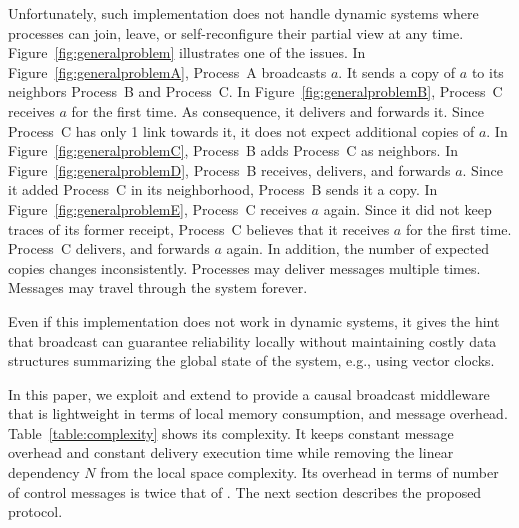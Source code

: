 Unfortunately, such implementation does not handle dynamic systems where
processes can join, leave, or self-reconfigure their partial view at any
time. Figure~\ref{fig:generalproblem} illustrates one of the issues. In
Figure~\ref{fig:generalproblemA}, Process~A broadcasts $a$. It sends a copy of
$a$ to its neighbors Process~B and Process~C. In
Figure~\ref{fig:generalproblemB}, Process~C receives $a$ for the first time.  As
consequence, it delivers and forwards it. Since Process~C has only 1 link
towards it, it does not expect additional copies of $a$. In
Figure~\ref{fig:generalproblemC}, Process~B adds Process~C as neighbors. In
Figure~\ref{fig:generalproblemD}, Process~B receives, delivers, and forwards
$a$. Since it added Process~C in its neighborhood, Process~B sends it a copy.
In Figure~\ref{fig:generalproblemE}, Process~C receives $a$ again. Since it did
not keep traces of its former receipt, Process~C believes that it receives $a$
for the first time. Process~C delivers, and forwards $a$ again. In addition, the
number of expected copies changes inconsistently. Processes may deliver messages
multiple times. Messages may travel through the system forever.

Even if this implementation does not work in dynamic systems, it gives the hint
that broadcast can guarantee reliability locally without maintaining costly data
structures summarizing the global state of the system, e.g., using vector
clocks.




In this paper, we exploit and extend \PCBROADCAST to provide a causal broadcast
middleware that is lightweight in terms of local memory consumption, and message
overhead. Table~\ref{table:complexity} shows its complexity. It keeps constant
message overhead and constant delivery execution time while removing the linear
dependency $N$ from the local space complexity. Its overhead in terms of number
of control messages is twice that of \PCBROADCAST.
The next section describes the proposed protocol.

